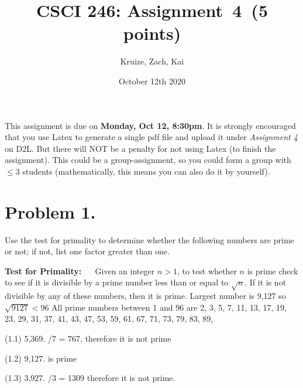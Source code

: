 \documentclass[11pt]{article}
\begin{document}
\date{October 12th 2020}

\title{CSCI 246: Assignment~4~(5 points)}

\author{Kruize, Zach, Kai}

\maketitle


\noindent
This assignment is due on {\bf Monday, Oct 12, 8:30pm}. It is strongly
encouraged that you use Latex to generate a single pdf file and upload it
under {\em Assignment 4} on D2L. But there will NOT be a penalty for not
using Latex (to finish the assignment). This could be a group-assignment,
so you could form a group with $\leq 3$ students (mathematically, this means
you can also do it by yourself).
\newline

\section*{Problem 1.}

\noindent
Use the test for primality to determine whether the following numbers are
prime or not; if not, list one factor greater than one.

{\bf Test for Primality:} ~~ Given an integer $n>1$, to test whether $n$ is
prime check to see if it is divisible by a prime number less than or equal to
$\sqrt{n}$. If it is not divisible by any of these numbers, then it is prime.
\newline
\newline
Largest number is 9,127 so $\sqrt{9127} < 96$
\newline
All prime numbers between 1 and 96 are 2, 3, 5, 7, 11, 13, 17, 19, 23, 29, 31, 37, 41, 43, 47, 53, 59, 61, 67, 71, 73, 79, 83, 89,
\newline

\noindent
(1.1) 5,369.
\newline
{}/7 = 767, therefore it is not prime
\newline

\noindent
(1.2) 9,127.
\newline
{} is prime
\newline

\noindent
\newline
\newline
(1.3) 3,927.
\newline
{}/3 = 1309 therefore it is not prime.
\newline
\end{document}
